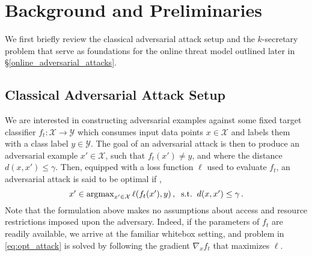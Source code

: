 \section{Background and Preliminaries}
We first briefly review the classical adversarial attack setup and the $k$-secretary problem that serve as foundations for the online threat model outlined later in \S\ref{online_adversarial_attacks}.

\subsection{Classical Adversarial Attack Setup}
We are interested in constructing adversarial examples against some fixed 
target classifier $f_{t}: \mathcal{X} \to \mathcal{Y}$ which consumes input data points $x \in \mathcal{X}$ and labels them with a class label $y \in \mathcal{Y}$. The goal of an adversarial attack is then to produce an adversarial example $x' \in \mathcal{X}$, such that $f_t(x') \neq y$, and where the distance $d(x,x') \leq \gamma$. Then, equipped with a loss function $\ell$ used to evaluate $f_{t}$, an adversarial attack is said to be optimal if \citep{carlini2017magnet, madry2017towards}, 
\begin{equation}\label{eq:opt_attack}
    \textstyle x' \in \operatorname*{\arg\!\max}_{x'\in {\mathcal{X}}}\ell(f_{t}(x'),y) \,, \;\; \text{s.t.} \;\; d(x,x') \leq \gamma \,.
\end{equation}
Note that the formulation above makes no assumptions about access and resource restrictions imposed upon the adversary. Indeed, if the parameters of $f_t$ are readily available, we arrive at the familiar whitebox setting, and problem in \eqref{eq:opt_attack} is solved by following the gradient $\nabla_x f_{t}$ that maximizes $\ell$. 

